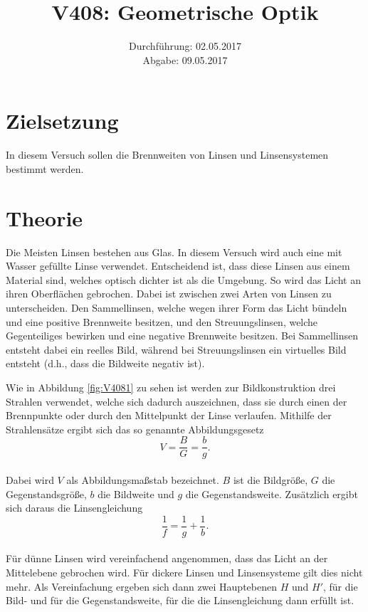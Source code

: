 \documentclass[
  bibliography=totoc,     %
  captions=tableheading,  %
  titlepage=firstiscover, %
]{scrartcl}
\title{V408: Geometrische Optik}
\author{
  Simon Schulte
  \texorpdfstring{
    \\
    \href{mailto:simon.schulte@udo.edu}{simon.schulte@udo.edu}
  }{}
  \texorpdfstring{\and}{, }
  Tim Sedlaczek
  \texorpdfstring{
    \\
    \href{mailto:tim.sedlaczek@udo.edu}{tim.sedlaczek@udo.edu}
  }{}
}
\date{Durchführung: 02.05.2017\\
      Abgabe: 09.05.2017}
\begin{document}
\maketitle
\thispagestyle{empty}
\tableofcontents
\newpage
\setcounter{page}{1}
\section{Zielsetzung}
\label{sec:zielsetzung}
In diesem Versuch sollen die Brennweiten von Linsen und Linsensystemen bestimmt
werden.
\section{Theorie}
\label{sec:theorie}
Die Meisten Linsen bestehen aus Glas. In diesem Versuch wird auch eine mit Wasser
gefüllte Linse verwendet. Entscheidend ist, dass diese Linsen aus einem Material
sind, welches optisch dichter ist als die Umgebung. So wird das Licht an ihren
Oberflächen gebrochen. Dabei ist zwischen zwei Arten von Linsen zu unterscheiden.
Den Sammellinsen, welche wegen ihrer Form das Licht bündeln und eine positive
Brennweite besitzen, und den Streuungslinsen, welche Gegenteiliges bewirken und
eine negative Brennweite besitzen. Bei Sammellinsen entsteht dabei ein reelles
Bild, während bei Streuungslinsen ein virtuelles Bild entsteht (d.h., dass die
Bildweite negativ ist).

\noindent
Wie in Abbildung \ref{fig:V4081} zu sehen ist werden zur Bildkonstruktion
drei Strahlen verwendet, welche sich dadurch auszeichnen, dass sie durch einen
der Brennpunkte oder durch den Mittelpunkt der Linse verlaufen.
Mithilfe der Strahlensätze ergibt sich das so genannte Abbildungsgesetz
\begin{equation}
  V = \frac{B}{G} = \frac{b}{g}.
  \label{eqn:abbildung}
\end{equation}\\
Dabei wird $V$ als Abbildungsmaßstab bezeichnet. $B$ ist die Bildgröße, $G$ die
Gegenstandsgröße, $b$ die Bildweite und $g$ die Gegenstandsweite.
Zusätzlich ergibt sich daraus die Linsengleichung
\begin{equation}
  \frac{1}{f} = \frac{1}{g} + \frac{1}{b}.
  \label{eqn:linsen}
\end{equation}\\
Für dünne Linsen wird vereinfachend angenommen, dass das Licht an der Mittelebene
gebrochen wird. Für dickere Linsen und Linsensysteme gilt dies nicht mehr.
Als Vereinfachung ergeben sich dann zwei Hauptebenen $H$ und $H'$,
für die Bild- und für die Gegenstandsweite, für die die Linsengleichung dann
erfüllt ist.
\end{document}
